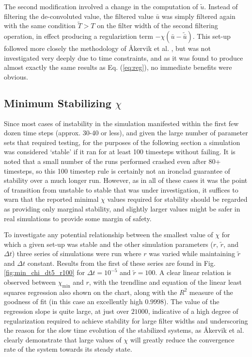 The second modification involved a change in the computation of $\tilde{u}$. Instead of filtering the de-convoluted value, the filtered value $\bar{u}$ was simply filtered again with the same condition $\tilde{T}>T$ on the filter width of the second filtering operation, in effect producing a regulariztion term $-\chi(\bar{u}-\tilde{\bar{u}})$. This set-up followed more closely the methodology of \AA kervik et al. \cite{Akervik2006}, but was not investigated very deeply due to time constraints, and as it was found to produce almost exactly the same results as Eq. (\ref{eq:reg}), no immediate benefits were obvious.

\subsection{Minimum Stabilizing $\chi$}

Since most cases of instability in the simulation manifested within the first few dozen time steps (approx. 30-40 or less), and given the large number of parameter sets that required testing, for the purposes of the following section a simulation was considered `stable' if it ran for at least 100 timesteps without failing. It is noted that a small number of the runs performed crashed even after 80+ timesteps, so this 100 timestep rule is certainly not an ironclad guarantee of stability over a much longer run. However, as in all of these cases it was the point of transition from unstable to stable that was under investigation, it suffices to warn that the reported minimal $\chi$ values required for stability should be regarded as providing only marginal stability, and slightly larger values might be safer in real simulations to provide some margin of safety.

To investigate any potential relationship between the smallest value of $\chi$ for which a given set-up was stable and the other simulation parameters ($r$, $\tilde{r}$, and $\Delta t$) three series of simulations were run where $r$ was varied while maintaining $\tilde{r}$ and $\Delta t$ constant. Results from the first of these series are found in Fig. \ref{fig:min_chi_dt5_r100} for $\Delta t=10^{-5}$ and $\tilde{r}=100$. A clear linear relation is observed between $\chi_{\mathrm{min}}$ and $r$, with the trendline and equation of the linear least squares regression also shown on the chart, along with the $R^2$ measure of the goodness of fit (in this case an excellently high $0.9998$). The value of the regression slope is quite large, at just over $21000$, indicative of a high degree of regularization required to achieve stability for large filter widths and underscoring the reason for the slow time evolution of the stabilized systems, as \AA kervik et al. \cite{Akervik2006} clearly demonstrate that large values of $\chi$ will greatly reduce the convergence rate of the system towards its steady state.

